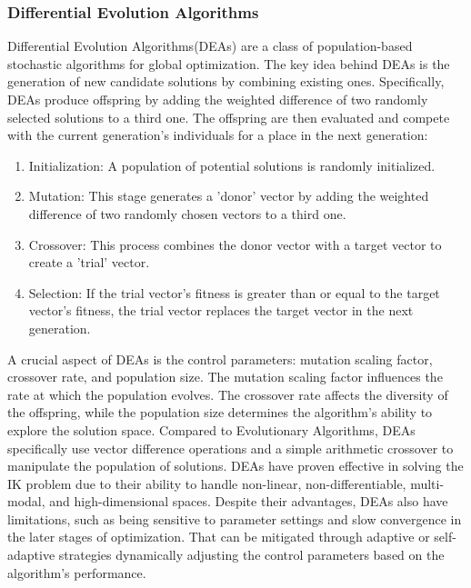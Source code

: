 \documentclass[conference]{IEEEtran}
\begin{document}
\subsubsection{Differential Evolution Algorithms}
Differential Evolution Algorithms(DEAs)\cite{storn_differential_1997} are a class of population-based stochastic algorithms for global optimization. The key idea behind DEAs is the generation of new candidate solutions by combining existing ones. Specifically, DEAs produce offspring by adding the weighted difference of two randomly selected solutions to a third one. The offspring are then evaluated and compete with the current generation's individuals for a place in the next generation:
\begin{enumerate}
  \item Initialization: A population of potential solutions is randomly initialized.
  \item Mutation: This stage generates a 'donor' vector by adding the weighted difference of two randomly chosen vectors to a third one.
  \item Crossover: This process combines the donor vector with a target vector to create a 'trial' vector.
  \item Selection: If the trial vector's fitness is greater than or equal to the target vector's fitness, the trial vector replaces the target vector in the next generation.
\end{enumerate}
A crucial aspect of DEAs is the control parameters: mutation scaling factor, crossover rate, and population size. The mutation scaling factor influences the rate at which the population evolves. The crossover rate affects the diversity of the offspring, while the population size determines the algorithm's ability to explore the solution space. Compared to Evolutionary Algorithms, DEAs specifically use vector difference operations and a simple arithmetic crossover to manipulate the population of solutions.
DEAs have proven effective in solving the IK problem \cite{zhang_research_2021}\cite{wu_huapeng_utilization_2000} due to their ability to handle non-linear, non-differentiable, multi-modal, and high-dimensional spaces. Despite their advantages, DEAs also have limitations, such as being sensitive to parameter settings and slow convergence in the later stages of optimization. That can be mitigated through adaptive or self-adaptive strategies dynamically adjusting the control parameters based on the algorithm's performance.
\end{document}
